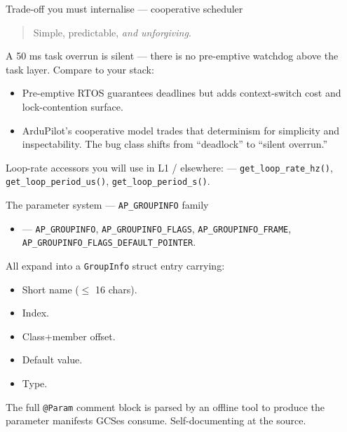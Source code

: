 \documentclass[aspectratio=169,11pt]{beamer}
\begin{document}
\begin{frame}[allowframebreaks]{Trade-off you must internalise --- cooperative scheduler}
  \begin{quote}
    Simple, predictable, \emph{and unforgiving}.
  \end{quote}
  \vfill
  A 50 ms task overrun is silent --- there is no pre-emptive watchdog above the task layer.
  \vfill
  Compare to your stack:
  \begin{itemize}
    \item Pre-emptive RTOS guarantees deadlines but adds context-switch cost and lock-contention surface.
    \item ArduPilot's cooperative model trades that determinism for simplicity and inspectability. The bug class shifts from ``deadlock'' to ``silent overrun.''
  \end{itemize}
  \vfill
  Loop-rate accessors you will use in L1 / elsewhere:  --- \texttt{get\_loop\_rate\_hz()}, \texttt{get\_loop\_period\_us()}, \texttt{get\_loop\_period\_s()}.
\end{frame}

\begin{frame}{The parameter system --- \texttt{AP\_GROUPINFO} family}
  \begin{itemize}
    \item {} --- \texttt{AP\_GROUPINFO}, \texttt{AP\_GROUPINFO\_FLAGS}, \texttt{AP\_GROUPINFO\_FRAME}, \texttt{AP\_GROUPINFO\_FLAGS\_DEFAULT\_POINTER}.
  \end{itemize}
  \vfill
  All expand into a \texttt{GroupInfo} struct entry carrying:
  \begin{itemize}
    \item Short name ($\leq$ 16 chars).
    \item Index.
    \item Class+member offset.
    \item Default value.
    \item Type.
  \end{itemize}
  \vfill
  The full \texttt{@Param} comment block is parsed by an offline tool to produce the parameter manifests GCSes consume. Self-documenting at the source.
\end{frame}
\end{document}
